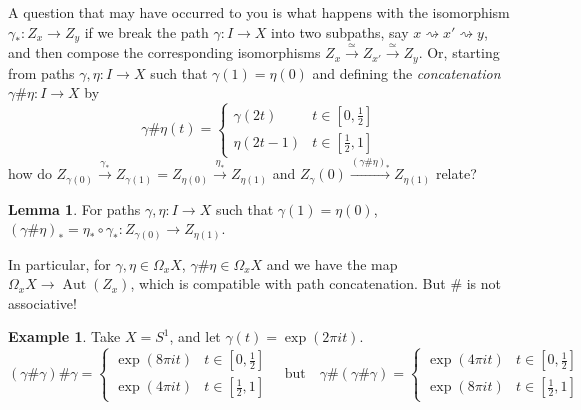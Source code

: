 \documentclass{tufte-handout}
\newcommand{\lecturenum}[1]{\marginnote{\color{red}Lecture #1}}
\DeclareMathOperator{\Aut}{Aut}
\theoremstyle{definition}
\newtheorem{lemma}{Lemma}
\newtheorem{example}{Example}
\begin{document}
A\lecturenum{7} question that may have occurred to you is what happens with the isomorphism 
$\gamma_*\colon Z_x\to Z_y$ if we break the path $\gamma\colon I\to X$ into two 
subpaths, say $x\rightsquigarrow x' \rightsquigarrow y$, and then compose the 
corresponding isomorphisms $Z_x\xrightarrow{\simeq}Z_{x'}\xrightarrow{\simeq}Z_y$. Or, 
starting from paths $\gamma,\eta\colon I\to X$ such that $\gamma(1) = \eta(0)$ and 
defining the \emph{concatenation} $\gamma\#\eta\colon I\to X$ by
\[
	\gamma\#\eta(t) = \begin{cases}
		\gamma(2t) & t\in[0,\frac12]\\
		\eta(2t-1) & t \in[\frac12,1]
	\end{cases} 
\]
how do $Z_{\gamma(0)} \xrightarrow{\gamma_*} 
Z_{\gamma(1)}=Z_{\eta(0)}\xrightarrow{\eta_*}Z_{\eta(1)}$ and 
$Z_\gamma(0) \xrightarrow{(\gamma\#\eta)_*}Z_{\eta(1)}$ relate?

\begin{lemma}
For paths $\gamma,\eta\colon I\to X$ such that $\gamma(1) = \eta(0)$, 
$(\gamma\#\eta)_* = \eta_*\circ\gamma_*\colon Z_{\gamma(0)}\to Z_{\eta(1)}$.
\end{lemma}

In particular, for $\gamma,\eta\in \Omega_xX$, $\gamma\#\eta\in \Omega_xX$ and we have 
the map $\Omega_x X \to \Aut(Z_x)$, which is compatible with path concatenation. But 
$\#$ is not associative!

\begin{example}
Take $X=S^1$, and let $\gamma(t)=\exp(2\pi it)$.
\[
	(\gamma\#\gamma)\#\gamma = \begin{cases}
		\exp(8\pi it) & t\in[0,\frac12]\\
		\exp(4\pi it) & t \in[\frac12,1]
	\end{cases} \quad \text{but}\quad
	\gamma\#(\gamma\#\gamma) = \begin{cases}
		\exp(4\pi it) & t\in[0,\frac12]\\
		\exp(8\pi it) & t \in[\frac12,1]
	\end{cases}
\]
\end{example}
\end{document}
